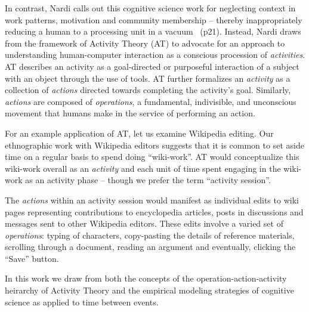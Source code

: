 In contrast, Nardi calls out this cognitive science work for neglecting context in work patterns, motivation and community membership -- thereby inappropriately reducing a human to a processing unit in a vacuum~\cite{nardi1996context} (p21).  Instead, Nardi draws from the framework of Activity Theory (AT) to advocate for an approach to understanding human-computer interaction as a conscious procession of \emph{activities}.  AT describes an activity as a goal-directed or purposeful interaction of a subject with an object through the use of tools. AT further formalizes an \emph{activity} as a collection of \emph{actions} directed towards completing the activity's goal.  Similarly, \emph{actions} are composed of \emph{operations}, a fundamental, indivisible, and unconscious movement that humans make in the service of performing an action.

For an example application of AT, let us examine Wikipedia editing.  Our ethnographic work with Wikipedia editors suggests that it is common to set aside time on a regular basis to spend doing ``wiki-work''.  AT would conceptualize this wiki-work overall as an \emph{activity} and each unit of time spent engaging in the wiki-work as an activity phase -- though we prefer the term ``activity session''.

The \emph{actions} within an activity session would manifest as individual edits to wiki pages representing contributions to encyclopedia articles, posts in discussions and messages sent to other Wikipedia editors.  These edits involve a varied set of \emph{operations}: typing of characters, copy-pasting the details of reference materials, scrolling through a document, reading an argument and eventually, clicking the ``Save'' button.

In this work we draw from both the concepts of the operation-action-activity heirarchy of Activity Theory and the empirical modeling strategies of cognitive science as applied to time between events.
